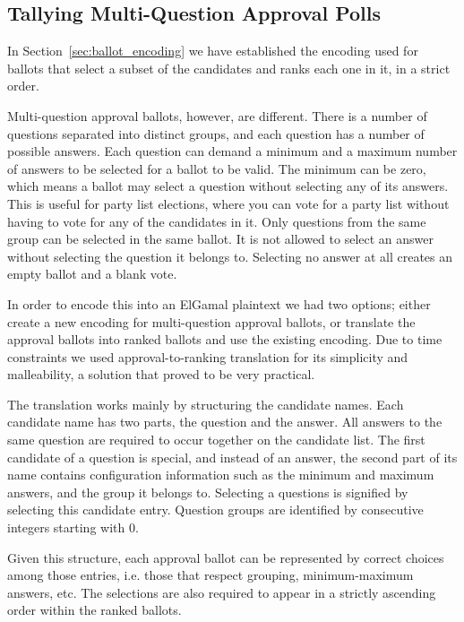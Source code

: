 \documentclass[letterpaper,10pt]{article}
\begin{document}

\subsection{Tallying Multi-Question Approval Polls}
\label{sec:approval_counting}
In Section~\ref{sec:ballot_encoding} we have established the encoding
used for ballots that select a subset of the candidates and ranks each
one in it, in a strict order.

Multi-question approval ballots, however, are different.
There is a number of questions separated into distinct groups,
and each question has a number of possible answers.
Each question can demand a minimum and a maximum number of answers
to be selected for a ballot to be valid.
The minimum can be zero, which means a ballot may select a question
without selecting any of its answers.
This is useful for party list elections, where you can vote for
a party list without having to vote for any of the candidates in it.
Only questions from the same group can be selected in the same ballot.
It is not allowed to select an answer without selecting the question
it belongs to.
Selecting no answer at all creates an empty ballot and a blank vote.

In order to encode this into an ElGamal plaintext we had two options;
either create a new encoding for multi-question approval ballots,
or translate the approval ballots into ranked ballots and use the
existing encoding.
Due to time constraints we used approval-to-ranking translation for
its simplicity and malleability, a solution that proved to be very
practical.

The translation works mainly by structuring the candidate names.
Each candidate name has two parts, the question and the answer.
All answers to the same question are required to occur together
on the candidate list.
The first candidate of a question is special,
and instead of an answer, the second part of its name contains
configuration information such as the minimum and maximum answers,
and the group it belongs to.
Selecting a questions is signified by selecting this candidate entry.
Question groups are identified by consecutive integers starting with 0.

Given this structure, each approval ballot can be represented by
correct choices among those entries, i.e. those that respect
grouping, minimum-maximum answers, etc.
The selections are also required to appear in a strictly ascending order
within the ranked ballots.
\end{document}
